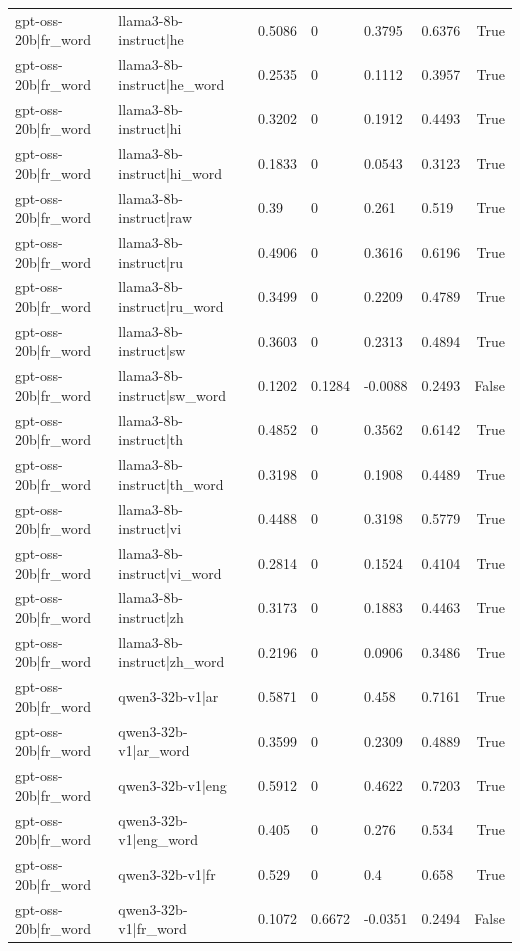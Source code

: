 \begin{table}
\begin{tabular}{llllllr}
gpt-oss-20b|fr_word & llama3-8b-instruct|he & 0.5086 & 0 & 0.3795 & 0.6376 & True \\
gpt-oss-20b|fr_word & llama3-8b-instruct|he_word & 0.2535 & 0 & 0.1112 & 0.3957 & True \\
gpt-oss-20b|fr_word & llama3-8b-instruct|hi & 0.3202 & 0 & 0.1912 & 0.4493 & True \\
gpt-oss-20b|fr_word & llama3-8b-instruct|hi_word & 0.1833 & 0 & 0.0543 & 0.3123 & True \\
gpt-oss-20b|fr_word & llama3-8b-instruct|raw & 0.39 & 0 & 0.261 & 0.519 & True \\
gpt-oss-20b|fr_word & llama3-8b-instruct|ru & 0.4906 & 0 & 0.3616 & 0.6196 & True \\
gpt-oss-20b|fr_word & llama3-8b-instruct|ru_word & 0.3499 & 0 & 0.2209 & 0.4789 & True \\
gpt-oss-20b|fr_word & llama3-8b-instruct|sw & 0.3603 & 0 & 0.2313 & 0.4894 & True \\
gpt-oss-20b|fr_word & llama3-8b-instruct|sw_word & 0.1202 & 0.1284 & -0.0088 & 0.2493 & False \\
gpt-oss-20b|fr_word & llama3-8b-instruct|th & 0.4852 & 0 & 0.3562 & 0.6142 & True \\
gpt-oss-20b|fr_word & llama3-8b-instruct|th_word & 0.3198 & 0 & 0.1908 & 0.4489 & True \\
gpt-oss-20b|fr_word & llama3-8b-instruct|vi & 0.4488 & 0 & 0.3198 & 0.5779 & True \\
gpt-oss-20b|fr_word & llama3-8b-instruct|vi_word & 0.2814 & 0 & 0.1524 & 0.4104 & True \\
gpt-oss-20b|fr_word & llama3-8b-instruct|zh & 0.3173 & 0 & 0.1883 & 0.4463 & True \\
gpt-oss-20b|fr_word & llama3-8b-instruct|zh_word & 0.2196 & 0 & 0.0906 & 0.3486 & True \\
gpt-oss-20b|fr_word & qwen3-32b-v1|ar & 0.5871 & 0 & 0.458 & 0.7161 & True \\
gpt-oss-20b|fr_word & qwen3-32b-v1|ar_word & 0.3599 & 0 & 0.2309 & 0.4889 & True \\
gpt-oss-20b|fr_word & qwen3-32b-v1|eng & 0.5912 & 0 & 0.4622 & 0.7203 & True \\
gpt-oss-20b|fr_word & qwen3-32b-v1|eng_word & 0.405 & 0 & 0.276 & 0.534 & True \\
gpt-oss-20b|fr_word & qwen3-32b-v1|fr & 0.529 & 0 & 0.4 & 0.658 & True \\
gpt-oss-20b|fr_word & qwen3-32b-v1|fr_word & 0.1072 & 0.6672 & -0.0351 & 0.2494 & False \\

\end{tabular}
\end{table}
